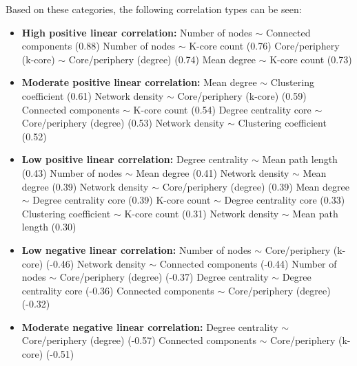 Based on these categories, the following correlation types can be seen:

\begin{itemize}
    \item \textbf{High positive linear correlation:} 
    \newline Number of nodes $\sim$ Connected components (0.88)
    \newline Number of nodes $\sim$ K-core count (0.76)
    \newline Core/periphery (k-core) $\sim$ Core/periphery (degree) (0.74)
    \newline Mean degree $\sim$ K-core count (0.73) 
    \item \textbf{Moderate positive linear correlation:}
    \newline Mean degree $\sim$ Clustering coefficient (0.61)
    \newline Network density $\sim$ Core/periphery (k-core) (0.59)
    \newline Connected components $\sim$ K-core count (0.54)
    \newline Degree centrality core $\sim$ Core/periphery (degree) (0.53)
    \newline Network density $\sim$ Clustering coefficient (0.52)
    \item \textbf{Low positive linear correlation:}
    \newline Degree centrality $\sim$ Mean path length (0.43)
    \newline Number of nodes $\sim$ Mean degree (0.41)
    \newline Network density $\sim$ Mean degree (0.39)
    \newline Network density $\sim$ Core/periphery (degree) (0.39)
    \newline Mean degree $\sim$ Degree centrality core (0.39)
    \newline K-core count $\sim$ Degree centrality core (0.33)
    \newline Clustering coefficient $\sim$ K-core count (0.31)
    \newline Network density $\sim$ Mean path length (0.30)
    \item \textbf{Low negative linear correlation:}
    \newline Number of nodes $\sim$ Core/periphery (k-core) (-0.46)
    \newline Network density $\sim$ Connected components (-0.44)
    \newline Number of nodes $\sim$ Core/periphery (degree) (-0.37)
    \newline Degree centrality $\sim$ Degree centrality core (-0.36)
    \newline Connected components $\sim$ Core/periphery (degree) (-0.32)
    \item \textbf{Moderate negative linear correlation:}
    \newline Degree centrality $\sim$ Core/periphery (degree) (-0.57)
    \newline Connected components $\sim$ Core/periphery (k-core) (-0.51)
\end{itemize}

